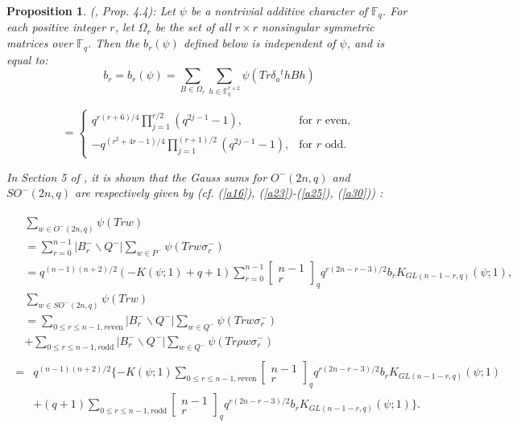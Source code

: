 \documentclass[a4,12pt]{elsart}
\newtheorem{proposition}[theorem]{Proposition}
\begin{document}
\begin{proposition}(\cite{DY}, Prop. 4.4):
Let $\psi$ be a nontrivial additive character of ${\mathbb{F}}_q$. For each
positive integer $r$, let $\Omega_{r}$ be the set of all $ r \times
r$ nonsingular symmetric matrices over ${\mathbb{F}}_q$. Then the
$b_{r}(\psi)$ defined below is independent of $\psi$, and is equal
to:
\begin{equation}\label{a30}
b_r=b_r( \psi )= \sum _{B \in \Omega_r } \sum_{ h \in {\mathbb{F}}_q^{r
\times 2}} \psi(Tr \delta_a{}^t h B h)
\end{equation}

\begin{equation*}
= \begin{cases}
  q^{r(r+ 6)/4}\prod_{j=1}^{r/2}(q^{2j-1}-1), & \text{for $r$ even},\\
  -q^{(r^2 +4r-1)/4 }\prod_{j=1}^{(r+1)/2}(q^{2j-1}-1), & \text{for $r$ odd.}
\end{cases}
\end{equation*}

In Section 5 of \cite{DY}, it is shown that the Gauss sums for
$O^{-}(2n,q)$ and $SO^{-}(2n,q)$ are respectively given by (cf.
(\ref{a16}), (\ref{a23})-(\ref{a25}), (\ref{a30})) :

\begin{align*}
\begin{split}
 &\sum_{w \in O^-(2n,q)} \psi(Tr w)\\
 &=\sum_{r=0}^{n-1 }|B_r^- \backslash Q^-| \sum _{ w \in P^-} \psi(Tr w \sigma_r^-)\\
 &=q^{(n-1)(n + 2)/2}(-K( \psi;1)+q+1)\sum_{ r=0}^{ n-1} \left[\substack{n-1\\r}\right]_q q^{r(2n-r-3)/2}b_rK_{GL(n-1-r,q)}(\psi;1),\\
&\sum_{w \in SO^-(2n,q)}\psi(Tr w)\\
 &=\sum_{ 0 \leq r \leq n-1, r \textrm{even} }|B_r^- \backslash Q^-| \sum_{ w \in Q^- } \psi ( Tr w \sigma_r^-)\\
 &+ \sum_{ 0 \leq r \leq n-1, r \textrm{odd} }|B_r^- \backslash Q^-| \sum_{ w \in Q^- } \psi ( Tr \rho w \sigma_r^- )
\end{split}
\end{align*}
\begin{align}\label{a31}
\begin{split}
 =&q^{(n-1)(n+2)/2} \{-K( \psi;1) \sum_{0 \leq r \leq n-1, r \textrm{even}}^{}\left[\substack{n-1\\r}\right]_q  q^{r(2n-r-3)/2}b_{r}K_{GL(n-1-r,q)}( \psi ;1) \\
 &+{(q+1)\sum _{0 \leq r \leq n-1, r \textrm{odd}} \left[\substack{n-1\\r}\right]_q q^{r(2n-r-3)/2}b_{r}K_{GL(n-1-r,q)}(\psi;1)}\}.
\end{split}
\end{align}

\end{proposition}
\end{document}
